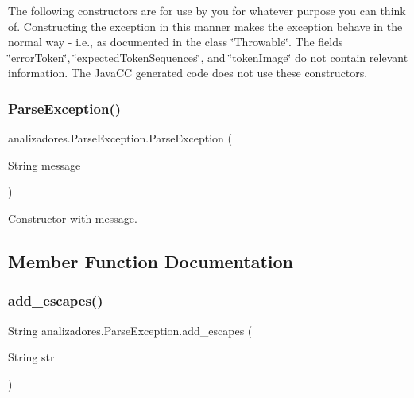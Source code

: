 The following constructors are for use by you for whatever purpose you can think of. Constructing the exception in this manner makes the exception behave in the normal way -\/ i.\+e., as documented in the class \char`\"{}\+Throwable\char`\"{}. The fields \char`\"{}error\+Token\char`\"{}, \char`\"{}expected\+Token\+Sequences\char`\"{}, and \char`\"{}token\+Image\char`\"{} do not contain relevant information. The Java\+CC generated code does not use these constructors. \mbox{\label{classanalizadores_1_1_parse_exception_ad521e60f04650096c71062ec8bf0c0a4}} 
\subsubsection{\texorpdfstring{Parse\+Exception()}{ParseException()}\hspace{0.1cm}{\footnotesize\ttfamily [3/3]}}
{\footnotesize\ttfamily analizadores.\+Parse\+Exception.\+Parse\+Exception (\begin{DoxyParamCaption}\item[{String}]{message }\end{DoxyParamCaption})}

Constructor with message. 

\subsection{Member Function Documentation}
\mbox{\label{classanalizadores_1_1_parse_exception_ad9fe07877080d0a28daa4d139860d110}} 
\subsubsection{\texorpdfstring{add\+\_\+escapes()}{add\_escapes()}}
{\footnotesize\ttfamily String analizadores.\+Parse\+Exception.\+add\+\_\+escapes (\begin{DoxyParamCaption}\item[{String}]{str }\end{DoxyParamCaption})\hspace{0.3cm}{\ttfamily [protected]}}

